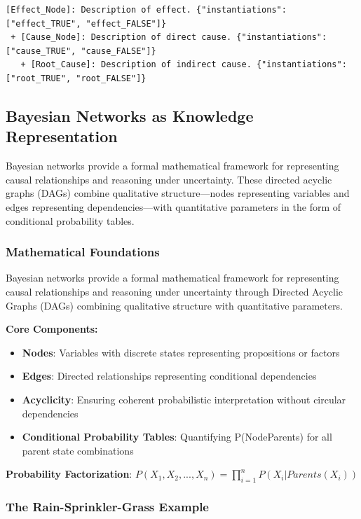 \documentclass[
  11pt,
  letterpaper,
]{book}
\providecommand{\tightlist}{%
  \setlength{\itemsep}{0pt}\setlength{\parskip}{0pt}}
\begin{document}
\begin{verbatim}
[Effect_Node]: Description of effect. {"instantiations": ["effect_TRUE", "effect_FALSE"]}
 + [Cause_Node]: Description of direct cause. {"instantiations": ["cause_TRUE", "cause_FALSE"]}
   + [Root_Cause]: Description of indirect cause. {"instantiations": ["root_TRUE", "root_FALSE"]}
\end{verbatim}

\subsection{Bayesian Networks as Knowledge
Representation}\label{sec-bayesian-networks}

Bayesian networks provide a formal mathematical framework for
representing causal relationships and reasoning under uncertainty. These
directed acyclic graphs (DAGs) combine qualitative structure---nodes
representing variables and edges representing dependencies---with
quantitative parameters in the form of conditional probability tables.

\subsubsection{Mathematical
Foundations}\label{sec-mathematical-foundations}

Bayesian networks provide a formal mathematical framework for
representing causal relationships and reasoning under uncertainty
through Directed Acyclic Graphs (DAGs) combining qualitative structure
with quantitative parameters.

\textbf{Core Components:}

\begin{itemize}
\tightlist
\item
  \textbf{Nodes}: Variables with discrete states representing
  propositions or factors
\item
  \textbf{Edges}: Directed relationships representing conditional
  dependencies
\item
  \textbf{Acyclicity}: Ensuring coherent probabilistic interpretation
  without circular dependencies
\item
  \textbf{Conditional Probability Tables}: Quantifying
  P(Node\textbar Parents) for all parent state combinations
\end{itemize}

\textbf{Probability Factorization}:
\(P(X_1, X_2, ..., X_n) = \prod_{i=1}^{n} P(X_i | Parents(X_i))\)

\subsubsection{The Rain-Sprinkler-Grass
Example}\label{sec-rain-sprinkler-example}
\end{document}
